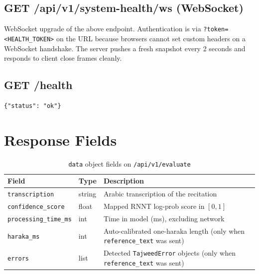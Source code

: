 \subsection{GET /api/v1/system-health/ws (WebSocket)}

WebSocket upgrade of the above endpoint. Authentication is via \texttt{?token=<HEALTH\_TOKEN>} on the URL because browsers cannot set custom headers on a WebSocket handshake. The server pushes a fresh snapshot every 2 seconds and responds to client close frames cleanly.

\subsection{GET /health}

\begin{emeraldbox}[title=Health Check Response (200 OK)]
\begin{verbatim}
{"status": "ok"}
\end{verbatim}
\end{emeraldbox}

\section{Response Fields}

\begin{table}[H]
  \centering
  \caption{\texttt{data} object fields on \texttt{/api/v1/evaluate}}
  \label{tab:api_fields}
  \renewcommand{\arraystretch}{1.3}
  \begin{tabular}{llp{6.8cm}}
    \toprule
    \textbf{Field} & \textbf{Type} & \textbf{Description} \\
    \midrule
    \texttt{transcription}      & string & Arabic transcription of the recitation \\
    \texttt{confidence\_score}  & float  & Mapped RNNT log-prob score in $[0, 1]$ \\
    \texttt{processing\_time\_ms} & int  & Time in model (ms), excluding network \\
    \texttt{haraka\_ms}         & int    & Auto-calibrated one-haraka length (only when \texttt{reference\_text} was sent) \\
    \texttt{errors}             & list   & Detected \texttt{TajweedError} objects (only when \texttt{reference\_text} was sent) \\
    \bottomrule
  \end{tabular}
\end{table}

